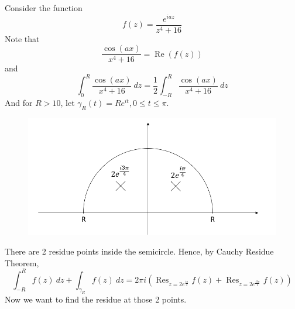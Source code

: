 \documentclass{article}
\DeclareMathOperator{\real}{Re}
\DeclareMathOperator{\Res}{Res}
\begin{document}
\begin{enumerate}
Consider the function
\[
f(z) = \frac{e^{iaz}}{z^4 + 16}
\]
Note that
\[\frac{\cos (ax)}{x^4 + 16} = \real(f(z))\]
and
\[\int_0^R \frac{\cos (ax)}{x^4 + 16}\ dz = \frac{1}{2}\int_{-R}^R \frac{\cos (ax)}{x^4 + 16}\ dz\]
And for $R > 10$, let $\gamma_R(t) = R e^{it}, 0\leq t \leq \pi$.
\begin{figure}[h]
\centering
\includegraphics[scale=0.6]{Q4_diagram}
\end{figure}

There are 2 residue points inside the semicircle. Hence, by Cauchy Residue Theorem,
\[
\int_{-R}^R f(z)\ dz + \int_{\gamma_R} f(z)\ dz = 2\pi i(\Res_{z=2e^{\frac{i\pi}{4}}} f(z) + \Res_{z=2e^{\frac{i3\pi}{4}}} f(z))
\]
Now we want to find the residue at those 2 points.


\end{enumerate}
\end{document}
